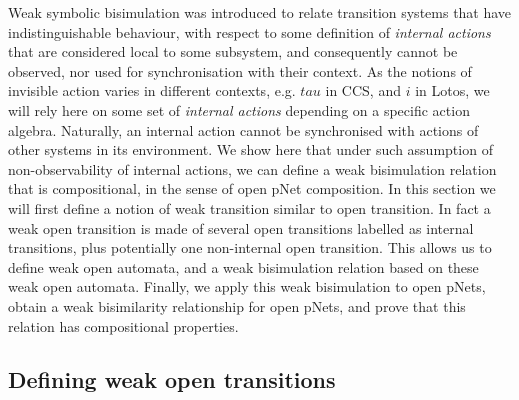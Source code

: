 \documentclass{lncs/llncs}
\newcommand{\TODO}[1]{\textcolor{red}{\textbf{[TODO:#1]}}}
\begin{document}
Weak symbolic bisimulation was introduced to relate transition systems
that have indistinguishable behaviour, with respect to some definition
of \emph{internal actions} that are considered local to some
subsystem, and consequently cannot be observed, nor used for
synchronisation with their context.
As the notions of invisible action varies in different contexts,
e.g. $tau$ in CCS, and $i$ in Lotos, we will rely here on some set of
\emph{internal actions} depending on a specific action
algebra. Naturally, an internal action cannot be synchronised with
actions of other systems in its environment. We show here that under such assumption of non-observability of internal actions, we can define a weak bisimulation relation that is compositional, in the sense of open pNet composition. In this section we will first define a notion of weak transition similar to open transition. In fact a weak open transition is made of several open transitions labelled as internal transitions, plus potentially one non-internal open transition. This allows us to define weak open automata, and a weak bisimulation relation based on these weak open automata. Finally, we apply this weak bisimulation to open pNets, obtain a weak bisimilarity relationship for open pNets, and prove that this relation has compositional properties.



\subsection{Defining weak open transitions}
\end{document}
